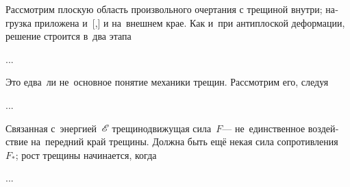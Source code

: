 
\begin{otherlanguage}{russian}

Рассмотрим плоскую область произвольного очертания с трещиной внутри; нагрузка приложена и~[,] и на~внешнем крае.
Как и~при антиплоской деформации, решение строится в~два этапа

...



\end{otherlanguage}



\begin{otherlanguage}{russian}

Это едва~ли не~основное понятие механики трещин.
Рассмотрим его, следуя

...



\end{otherlanguage}



\begin{otherlanguage}{russian}

Связанная
с~энергией~${\mathscr{E}\hspace{-0.2ex}}$
трещинодвижущая сила~$F$\:---
не~единственное
воздействие
на~передний край
трещины.
Должна быть ещё
некая
сила сопротивления~$F_{*}$;
рост
трещины
начинается,
когда

...



\end{otherlanguage}

